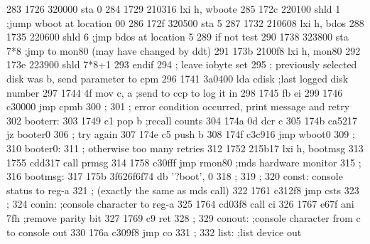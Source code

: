 283      1726 320000               sta      0
284      1729 210316               lxi      h, wboote
285      172c 220100               shld     1          ;jump wboot at location 00
286      172f 320500               sta      5
287      1732 210608               lxi      h, bdos
288      1735 220600               shld     6          ;jmp bdos at location 5
289                                if       not test
290      1738 323800               sta      7*8        ;jmp to mon80 (may have changed by ddt)
291      173b 2100f8               lxi      h, mon80
292      173e 223900               shld     7*8+1
293                                endif
294                       ;        leave iobyte set
295                       ;        previously selected disk was b, send parameter to cpm
296      1741 3a0400               lda      cdisk      ;last logged disk number
297      1744 4f                   mov      c, a       ;send to ccp to log it in
298      1745 fb                   ei
299      1746 c30000               jmp      cpmb
300                       ;
301                       ;        error condition occurred, print message and retry
302                       booterr:
303      1749 c1                   pop      b          ;recall counts
304      174a 0d                   dcr      c
305      174b ca5217               jz       booter0
306                       ;        try again
307      174e c5                   push     b
308      174f c3c916               jmp      wboot0
309                       ;
310                       booter0:
311                       ;        otherwise too many retries
312      1752 215b17               lxi      h, bootmsg
313      1755 cdd317               call     prmsg
314      1758 c30fff               jmp      rmon80     ;mds hardware monitor
315                       ;
316                       bootmsg:
317      175b 3f626f6f74           db       '?boot', 0
318                       ;
319                       ;
320                       const:   console status to reg-a
321                       ;        (exactly the same as mds call)
322      1761 c312f8               jmp      csts
323                       ;
324                       conin:   ;console character to reg-a
325      1764 cd03f8               call     ci
326      1767 e67f                 ani      7fh        ;remove parity bit
327      1769 c9                   ret
328                       ;
329                       conout:  ;console character from c to console out
330      176a c309f8               jmp      co
331                       ;
332                       list:    ;list device out
